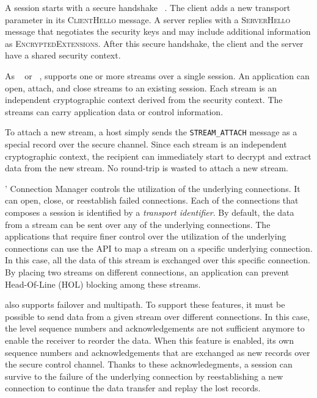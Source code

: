 A \tcpls session starts with a secure  handshake ~\cite{rfc8446}. The
client adds a new \tcpls transport parameter in its \textsc{ClientHello}
message. A \tcpls server replies with a \textsc{ServerHello} message that
negotiates the security keys and may include additional \tcpls information as
\textsc{EncryptedExtensions}. After this secure handshake, the client and the
server have a shared security context.

As \sctp~\cite{rfc4960} or \quic~\cite{draft-ietf-quic-transport}, \tcpls
supports one or more streams over a single \tcpls session. An application can
open, attach, and close streams to an existing \tcpls session. Each stream is an
independent cryptographic context derived from the \tcpls security context. The
\tcpls streams can carry application data or control information.


To attach a new stream, a host simply sends the \texttt{STREAM\_ATTACH} message
as a special \tls record over the secure channel. Since each stream is an
independent cryptographic context, the recipient can immediately start to
decrypt and extract data from the new stream. No round-trip is wasted to attach
a new stream.

\tcpls' Connection Manager controls the utilization of the underlying \tcp
connections. It can open, close, or reestablish failed \tcp connections. Each of
the connections that composes a \tcpls session is identified by a
\emph{transport identifier}. By default, the data from a stream can be sent over
any of the underlying \tcp connections. The applications that require finer
control over the utilization of the underlying \tcp connections can use the
\tcpls API to map a stream on a specific underlying connection. In this case,
all the data of this stream is exchanged over this specific connection. By
placing two streams on different connections, an application can prevent
Head-Of-Line (HOL) blocking among these streams.

\tcpls also supports failover and multipath. To support these features, it must
be possible to send data from a given stream over different \tcp connections. In
this case, the \tcp level sequence numbers and acknowledgements are not
sufficient anymore to enable the receiver to reorder the data. When this feature
is enabled, \tcpls its own sequence numbers and acknowledgements that are
exchanged as new \tls records over the secure control channel.  Thanks to these
\tcpls acknowledegments, a \tcpls session can survive to the failure of the
underlying \tcp connection by reestablishing a new \tcp connection to continue
the data transfer and replay the lost records.

